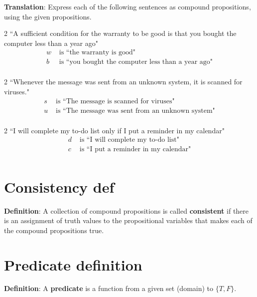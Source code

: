 \documentclass[12pt, oneside]{article}
\begin{document}
{\bf Translation}: Express each of the following sentences as compound propositions, using
the given propositions.

\begin{multicols}{2}
``A sufficient condition for the warranty to be good is that you bought the computer less than a year ago"
\columnbreak
\begin{align*}
w &\text{ is  ``the warranty is good"} \\
b &\text{ is  ``you bought the computer less than a year ago"} \\
\end{align*}
\end{multicols}
\vfill

\begin{multicols}{2}
``Whenever the message was sent from an unknown system, it is scanned for viruses."
\columnbreak
\begin{align*}
s &\text{ is  ``The message is scanned for viruses"} \\
u &\text{ is  ``The message was sent from an unknown system"} \\
\end{align*}
\end{multicols}
\vfill

\begin{multicols}{2}
``I will complete my to-do list only if I put a reminder in my calendar"
\columnbreak
\begin{align*}
d &\text{ is  ``I will complete my to-do list"} \\
c &\text{ is  ``I put a reminder in my calendar"} \\
\end{align*}
\end{multicols}
\vfill \vfill
\section*{Consistency def}


{\bf Definition}: A collection of  compound  propositions
is called {\bf consistent} if  there
is  an assignment  of  truth values
to  the  propositional variables that makes
each of the compound propositions  true.
 \vfill
\section*{Predicate definition}


{\bf  Definition}: A  {\bf predicate}  is  a function from a given set (domain) to $\{T,F\}$.
\end{document}
